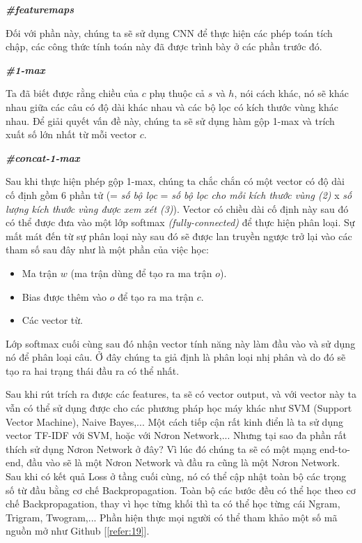 \textbf{\textit{\#featuremaps}}

Đối với phần này, chúng ta sẽ sử dụng CNN để thực hiện các phép toán tích chập, các công thức tính toán này đã được trình bày ở các phần trước đó.

\textbf{\textit{\#1-max}}

Ta đã biết được rằng chiều của $c$ phụ thuộc cả $s$ và $h$, nói cách khác, nó sẽ khác nhau giữa các câu có độ dài khác nhau và các bộ lọc có kích thước vùng khác nhau. Để giải quyết vấn đề này, chúng ta sẽ sử dụng hàm gộp 1-max và trích xuất số lớn nhất từ mỗi vector $c$.

\textbf{\textit{\#concat-1-max}}

Sau khi thực hiện phép gộp 1-max, chúng ta chắc chắn có một vector có độ dài cố định gồm 6 phần tử (= \textit{số bộ lọc} = \textit{số bộ lọc cho mỗi kích thước vùng (2)} x \textit{số lượng kích thước vùng được xem xét (3)}). Vector có chiều dài cố định này sau đó có thể được đưa vào một lớp softmax \textit{(fully-connected)} để thực hiện phân loại. Sự mất mát đến từ sự phân loại này sau đó sẽ được lan truyền ngược trở lại vào các tham số sau đây như là một phần của việc học:
\begin{itemize}
  \item Ma trận $w$ (ma trận dùng để tạo ra ma trận $o$).
  \item Bias được thêm vào $o$ để tạo ra ma trận $c$.
  \item Các vector từ.
\end{itemize}

Lớp softmax cuối cùng sau đó nhận vector tính năng này làm đầu vào và sử dụng nó để phân loại câu. Ở đây chúng ta giả định là phân loại nhị phân và do đó sẽ tạo ra hai trạng thái đầu ra có thể nhất.

Sau khi rút trích ra được các features, ta sẽ có vector output, và với vector này ta vẫn có thể sử dụng được cho các phương pháp học máy khác như SVM (Support Vector Machine), Naive Bayes,... Một cách tiếp cận rất kinh điển là ta sử dụng vector TF-IDF với SVM, hoặc với Nơron Network,... Nhưng tại sao đa phần rất thích sử dụng Nơron Network ở đây? Vì lúc đó chúng ta sẽ có một mạng end-to-end, đầu vào sẽ là một Nơron Network và đầu ra cũng là một Nơron Network. Sau khi có kết quả Loss ở tầng cuối cùng, nó có thể cập nhật toàn bộ các trọng số từ đầu bằng cơ chế Backpropagation. Toàn bộ các bước đều có thể học theo cơ chế Backpropagation, thay vì học từng khối thì ta có thể học từng cái Ngram, Trigram, Twogram,... Phần hiện thực mọi người có thể tham khảo một số mã nguồn mở như Github [\ref{refer:19}].

